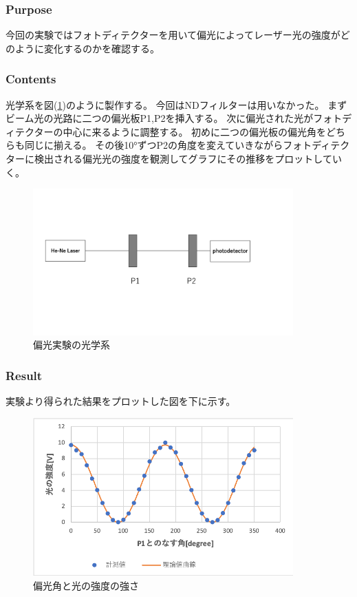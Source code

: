 \documentclass[11pt, a4paper]{jsarticle}
\begin{document}
\subsubsection{Purpose}
今回の実験ではフォトディテクターを用いて偏光によってレーザー光の強度がどのように変化するのかを確認する。
\subsubsection{Contents}
光学系を図(\ref{fig:17})のように製作する。
今回はNDフィルターは用いなかった。
まずビーム光の光路に二つの偏光板P1,P2を挿入する。
次に偏光された光がフォトディテクターの中心に来るように調整する。
初めに二つの偏光板の偏光角をどちらも同じに揃える。
その後10°ずつP2の角度を変えていきながらフォトディテクターに検出される偏光光の強度を観測してグラフにその推移をプロットしていく。

\begin{figure}[htbp]
 \begin{center}
  \includegraphics[width=100mm]{fig17.png}
 \end{center}
 \caption{偏光実験の光学系}
 \label{fig:17}
\end{figure}

\subsubsection{Result}
実験より得られた結果をプロットした図を下に示す。

\begin{figure}[htbp]
 \begin{center}
  \includegraphics[width=100mm]{fig18.png}
 \end{center}
 \caption{偏光角と光の強度の強さ}
 \label{fig:18}
\end{figure}
\end{document}
